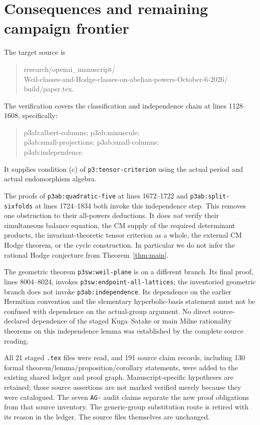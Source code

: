 \documentclass[11pt]{article}
\theoremstyle{remark}
\begin{document}
\section{Consequences and remaining campaign frontier}

The target source is
\begin{quote}\small\ttfamily
research/openai\_manuscript/\\
Weil-classes-and-Hodge-classes-on-abelian-powers-October-6-2026/\\
build/paper.tex.
\end{quote}
The verification covers the classification and independence chain
at lines 1128--1608, specifically:
\begin{quote}\small\ttfamily
p3ab:albert-columns; p3ab:minuscule;\\
p3ab:small-projections; p3ab:small-columns;\\
p3ab:independence.
\end{quote}
It supplies condition (c) of
\texttt{p3:tensor-criterion} using the actual period and actual
endomorphism algebra.

The proofs of \texttt{p3ab:quadratic-five} at lines 1672--1722 and
\texttt{p3ab:split-sixfolds} at lines 1724--1834 both invoke this
independence step. This removes one obstruction to their
all-powers deductions. It does \emph{not} verify their simultaneous
balance equation, the CM supply of the required determinant
products, the invariant-theoretic tensor criterion as a whole,
the external CM Hodge theorem, or the cycle construction.
In particular we do not infer the rational Hodge conjecture from
Theorem~\ref{thm:main}.

The geometric theorem \texttt{p3sw:weil-plane} is on a different
branch. Its final proof, lines 8004--8024, invokes
\texttt{p3sw:endpoint-all-lattices}; the inventoried geometric
branch does not invoke \texttt{p3ab:independence}. Its dependence
on the earlier Hermitian convention and the elementary
hyperbolic-basis statement must not be confused with dependence
on the actual-group argument. No direct source-declared dependence
of the staged Kuga--Satake or main Milne rationality theorems on
this independence lemma was established by the complete source
reading.

All 21 staged \texttt{.tex} files were read, and 191 source claim
records, including 130 formal theorem/lemma/proposition/corollary
statements, were added to the existing shared ledger and proof
graph. Manuscript-specific hypotheses are retained; those source
assertions are not marked verified merely because they were
catalogued. The seven \texttt{AG-} audit claims separate the new
proof obligations from that source inventory. The generic-group
substitution route is retired with its reason in the ledger.
The source files themselves are unchanged.
\end{document}
